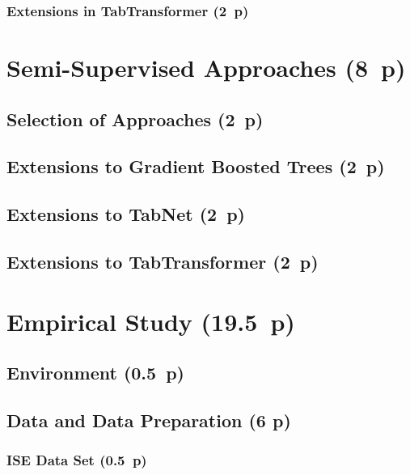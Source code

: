 \subsubsection{Extensions in
  TabTransformer (2~p)}\label{sec:extensions-in-tabtransformer}

\newpage
\section{Semi-Supervised Approaches (8~p)}\label{sec:semi-supervised-approaches}

\subsection{Selection of Approaches (2~p)}\label{sec:selection-of-approaches-1}

\subsection{Extensions to Gradient Boosted
  Trees (2~p)}\label{sec:extensions-to-gradient-boosted-trees}

\subsection{Extensions to TabNet (2~p)}\label{sec:extensions-to-tabnet}

\subsection{Extensions to
  TabTransformer (2~p)}\label{sec:extensions-to-tabtransformer}

\newpage
\section{Empirical Study (19.5~p)}\label{sec:empirical-study}

\subsection{Environment (0.5~p)}\label{sec:environment}

\subsection{Data and Data Preparation (6 p)}\label{sec:data-and-data-preparation}

\subsubsection{ISE Data Set (0.5~p)}\label{sec:ise-data-set}

